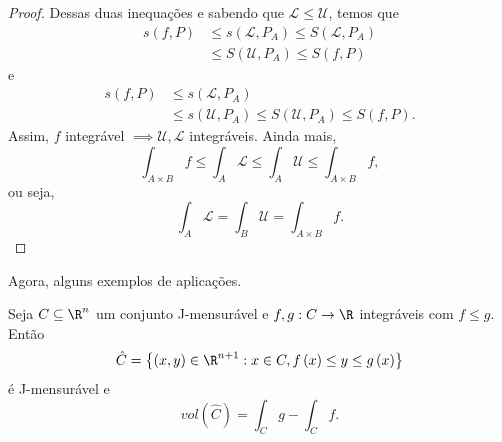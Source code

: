 \begin{proof}
    Dessas duas inequações e sabendo que $\mathcal{L} \le \mathcal{U}$, temos que
    \begin{align*}
	s\left( f,P \right) &\le s\left( \mathcal{L}, P_A \right) \le S\left( \mathcal{L},P_A \right) \\
			    &\le S\left(\mathcal{U}, P_A  \right) \le S\left( f,P \right) 
    \end{align*}
    e
    \begin{align*}
	s\left( f,P \right) &\le s\left( \mathcal{L}, P_A \right)  \\
			    &\le s\left( \mathcal{U},P_A \right)\le S\left(\mathcal{U}, P_A  \right) \le S\left( f,P \right) 
    .\end{align*}
    Assim, $f$ integrável $\implies \mathcal{U}, \mathcal{L}$ integráveis. Ainda mais, \[
    \int_{A\times B} f \le \int_A \mathcal{L} \le \int_A \mathcal{U} \le \int_{A\times B} f
    ,\] ou seja, \[
    \int_A \mathcal{L} = \int_B \mathcal{U} = \int_{A\times B} f
    .\] 
\end{proof}

Agora, alguns exemplos de aplicações.

\begin{prop}
    Seja $C\subseteq\R^{n}$ um conjunto J-mensurável e $f, g : C\to \R$ integráveis com $f\le g$. Então \[
    \hat{C} = \left\{ \left( x,y \right) \in \R^{n+1}: x\in C, f\left( x \right) \le y\le g\left( x \right)  \right\} 
    \] é J-mensurável e \[
    vol \left( \hat{C} \right) = \int_C g - \int_C f
    .\] 
\end{prop}

